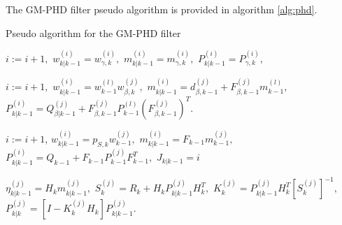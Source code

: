 The GM-PHD filter pseudo algorithm is provided in algorithm \ref{alg:phd}.
\algrenewcommand{}
\algrenewcommand{}
\algrenewcommand{}
\begin{algorithm}[h]
    \caption{Pseudo algorithm for the GM-PHD filter}
    \begin{algorithmic}[1]

        \State
            \State $i:= i+1,$
            \State $w_{k|k-1}^{(i)} = w_{\gamma,k}^{(i)},$ \quad
            $m_{k|k-1}^{(i)} = m_{\gamma,k}^{(i)},$ \quad
            $P_{k|k-1}^{(i)} = P_{\gamma,k}^{(i)},$
        \EndFor

                \State $i:=i+1,$
                \State $w_{k|k-1}^{(i)} = w_{k-1}^{(l)} w_{\beta,k}^{(j)},$
                \State $m_{k|k-1}^{(i)} = d_{\beta,k-1}^{(j)} + F_{\beta,k-1}^{(j)} m_{k-1}^{(l)},$
                \State $P_{k|k-1}^{(i)} = Q_{\beta|k-1}^{(j)} + F_{\beta,k-1}^{(j)} P_{k-1}^{(l)} (F_{\beta,k-1}^{(j)})^T.$
            \EndFor
        \EndFor
        \EndProcedure
        \State


            \State $i:=i+1$,
            \State $w_{k|k-1}^{(i)} = p_{S,k} w_{k-1}^{(j)},$
            \State $m_{k|k-1}^{(i)} = F_{k-1} m_{k-1}^{(j)},$
            \State $P_{k|k-1}^{(i)} = Q_{k-1} + F_{k-1} P_{k-1}^{(j)} F_{k-1}^T,$
        \EndFor
        \State $J_{k|k-1} = i$
        \EndProcedure

        \State
            \State $\eta_{k|k-1}^{(j)} = H_k m_{k|k-1}^{(j)},$ \quad
             $S_k^{(j)} = R_k + H_k P_{k|k-1}^{(j)} H_k^T,$
            \State $K_k^{(j)} = P_{k|k-1}^{(j)} H_k^T [S_k^{(j)}]^{-1},$ \quad
             $P_{k|k}^{(j)} = [I - K_k^{(j)} H_k] P_{k|k-1}^{(j)}.$
        \EndFor
        \EndProcedure


\end{algorithmic}
\end{algorithm}
